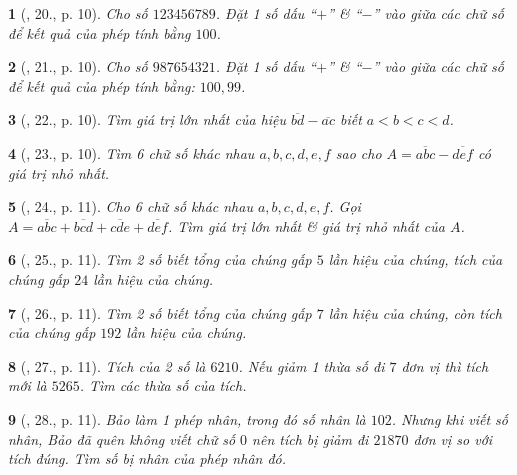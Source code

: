 \documentclass{article}
\newtheorem{baitoan}{}
\begin{document}
\begin{baitoan}[\cite{Binh_Toan_6_tap_1}, 20., p. 10]
	Cho số $123456789$. Đặt 1 số dấu ``$+$'' \& ``$-$'' vào giữa các chữ số để kết quả của phép tính bằng $100$.
\end{baitoan}

\begin{baitoan}[\cite{Binh_Toan_6_tap_1}, 21., p. 10]
	Cho số $987654321$. Đặt 1 số dấu ``$+$'' \& ``$-$'' vào giữa các chữ số để kết quả của phép tính bằng: $100,99$.
\end{baitoan}

\begin{baitoan}[\cite{Binh_Toan_6_tap_1}, 22., p. 10]
	Tìm giá trị lớn nhất của hiệu $\overline{bd} - \overline{ac}$ biết $a < b < c < d$.
\end{baitoan}

\begin{baitoan}[\cite{Binh_Toan_6_tap_1}, 23., p. 10]
	Tìm 6 chữ số khác nhau $a,b,c,d,e,f$ sao cho $A = \overline{abc} - \overline{def}$ có giá trị nhỏ nhất.
\end{baitoan}

\begin{baitoan}[\cite{Binh_Toan_6_tap_1}, 24., p. 11]
	Cho 6 chữ số khác nhau $a,b,c,d,e,f$. Gọi $A = \overline{abc} + \overline{bcd} + \overline{cde} + \overline{def}$. Tìm giá trị lớn nhất \& giá trị nhỏ nhất của $A$.
\end{baitoan}

\begin{baitoan}[\cite{Binh_Toan_6_tap_1}, 25., p. 11]
	Tìm 2 số biết tổng của chúng gấp $5$ lần hiệu của chúng, tích của chúng gấp $24$ lần hiệu của chúng.
\end{baitoan}

\begin{baitoan}[\cite{Binh_Toan_6_tap_1}, 26., p. 11]
	Tìm 2 số biết tổng của chúng gấp $7$ lần hiệu của chúng, còn tích của chúng gấp $192$ lần hiệu của chúng.
\end{baitoan}

\begin{baitoan}[\cite{Binh_Toan_6_tap_1}, 27., p. 11]
	Tích của 2 số là $6210$. Nếu giảm 1 thừa số đi $7$ đơn vị thì tích mới là $5265$. Tìm các thừa số của tích.
\end{baitoan}

\begin{baitoan}[\cite{Binh_Toan_6_tap_1}, 28., p. 11]
	Bảo làm 1 phép nhân, trong đó số nhân là $102$. Nhưng khi viết số nhân, Bảo đã quên không viết chữ số $0$ nên tích bị giảm đi $21870$ đơn vị so với tích đúng. Tìm số bị nhân của phép nhân đó.
\end{baitoan}
\end{document}
